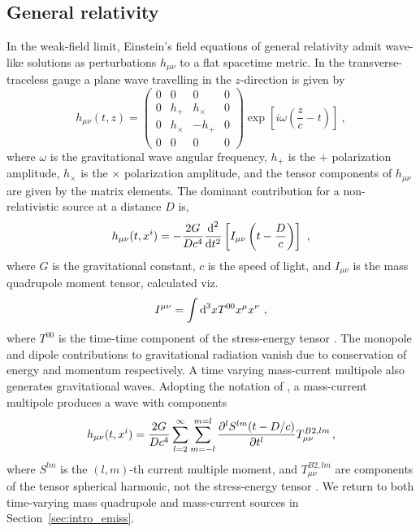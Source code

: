 \subsection{General relativity} \label{sec:intro_gw}
In the weak-field limit, Einstein's field equations of general relativity admit wave-like solutions as perturbations $h_{\mu \nu}$ to a flat spacetime metric. In the transverse-traceless gauge a plane wave travelling in the $z$-direction is given by
\begin{equation}
    h_{\mu \nu}(t, z) = \begin{pmatrix}
        0 & 0 & 0 & 0 \\
        0 & h_+ & h_\times & 0 \\
        0 & h_\times & -h_+ & 0 \\
        0 & 0 & 0 & 0
    \end{pmatrix} \exp \left[i \omega \left(\frac{z}{c} - t\right) \right]\ , \label{eq:planewave}
\end{equation}
where $\omega$ is the gravitational wave angular frequency, $h_+$ is the $+$ polarization amplitude, $h_\times$ is the $\times$ polarization amplitude, and the tensor components of $h_{\mu\nu}$ are given by the matrix elements. The dominant contribution for a non-relativistic source at a distance $D$ is,
\begin{equation}
    h_{\mu \nu} (t, x^i) = -\frac{2 G}{D c^4} \frac{\textrm{d}^2}{\textrm{d} t^2} \left[I_{\mu \nu}\left(t - \frac{D}{c}\right)\right]\ , \label{eq:hmunu}
\end{equation}
where $G$ is the gravitational constant, $c$ is the speed of light, and $I_{\mu \nu}$ is the mass quadrupole moment tensor, calculated viz.
\begin{equation}
    I^{\mu \nu} = \int \textrm{d}^3x T^{00}x^\mu x^\nu\ , \label{eq:massquad}
\end{equation}
where $T^{00}$ is the time-time component of the stress-energy tensor \citep{Schutz2022}. The monopole and dipole contributions to gravitational radiation vanish due to conservation of energy and momentum respectively. A time varying mass-current multipole also generates gravitational waves. Adopting the notation of \citet{Thorne1980}, a mass-current multipole produces a wave with components
\begin{equation}
    h_{\mu \nu} (t, x^i) = \frac{2 G}{D c^4} \sum_{l=2}^{\infty} \sum_{m=-l}^{m=l} \frac{\partial ^l S^{lm}(t - D/c)}{\partial t^l} T^{B2,lm}_{\mu \nu}\,, \label{eq:hmunu_current}
\end{equation}
where $S^{lm}$ is the $(l,m)$-th current multiple moment, and $T^{B2,lm}_{\mu \nu}$ are components of the tensor spherical harmonic, not the stress-energy tensor \citep{Mathews1962,Thorne1980}. We return to both time-varying mass quadrupole and mass-current sources in Section~\ref{sec:intro_emiss}.

